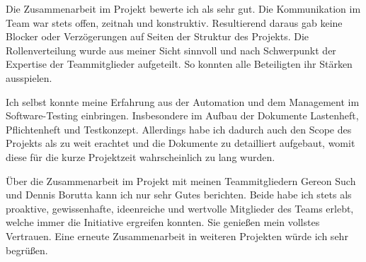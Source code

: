 Die Zusammenarbeit im Projekt bewerte ich als sehr gut. Die Kommunikation im Team war stets offen, zeitnah und konstruktiv. Resultierend daraus gab keine Blocker oder Verzögerungen auf Seiten der Struktur des Projekts. Die Rollenverteilung wurde aus meiner Sicht sinnvoll und nach Schwerpunkt der Expertise der Teammitglieder aufgeteilt. So konnten alle Beteiligten ihr Stärken ausspielen.

Ich selbst konnte meine Erfahrung aus der Automation und dem Management im Software-Testing einbringen. Insbesondere im Aufbau der Dokumente Lastenheft, Pflichtenheft und Testkonzept. Allerdings habe ich dadurch auch den Scope des Projekts als zu weit erachtet und die Dokumente zu detailliert aufgebaut, womit diese für die kurze Projektzeit wahrscheinlich zu lang wurden.

Über die Zusammenarbeit im Projekt mit meinen Teammitgliedern Gereon Such und Dennis Borutta kann ich nur sehr Gutes berichten. Beide habe ich stets als proaktive, gewissenhafte, ideenreiche und wertvolle Mitglieder des Teams erlebt, welche immer die Initiative ergreifen konnten. Sie genießen mein vollstes Vertrauen. Eine erneute Zusammenarbeit in weiteren Projekten würde ich sehr begrüßen.

